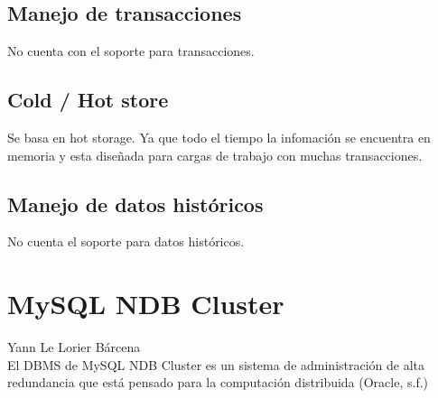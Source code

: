 \documentclass{acmart}
\begin{document}
\subsection{Manejo de transacciones}

No cuenta con el soporte para transacciones.

\subsection{Cold / Hot store}

Se basa en hot storage. Ya que todo el tiempo la infomación se encuentra en memoria y esta diseñada para cargas de trabajo con muchas transacciones.

\subsection{Manejo de datos históricos}

No cuenta el soporte para datos históricos.

\newpage

\section{MySQL NDB Cluster}
Yann Le Lorier Bárcena\\
El DBMS de MySQL NDB Cluster es un sistema de administración de alta redundancia que está pensado para la computación distribuida (Oracle, s.f.)
\end{document}
